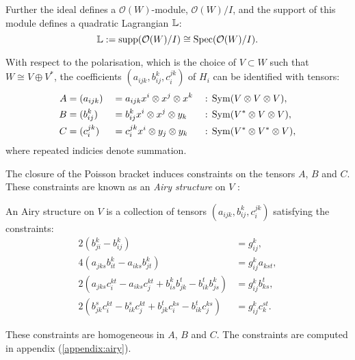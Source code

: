     Further the ideal defines a \( \mathcal{O}(W) \)-module, \( \mathcal{O}(W)/I\), and  the support of this module defines a quadratic Lagrangian \( \mathbb{L} \): \[ \mathbb{L}  := \mathrm{supp}( \mathcal{O}(W)/I ) \cong \mathrm{Spec}( \mathcal{O}(W)/I ) .\]
    
    With respect to the polarisation, which is the choice of \(V\subset W\) such that \(W\cong V\oplus V^*\), the coefficients \((a_{ijk},b_{ij}^k,c_{i}^{jk})\) of \(H_i\)  can be identified with tensors:
    \begin{alignat*}{3}  
    \label{airytensor}
    A & =(a_{ijk}) && = a_{ijk}x^i \otimes x^j \otimes x^k && : \,  \mathrm{Sym}(V\otimes V\otimes V),\\
    B & =(b_{ij}^k) && = b_{ij}^k x^i \otimes x^j \otimes y_k &&  :\,  \mathrm{Sym}( V^*\otimes V\otimes V),\\   
    C & =(c_i^{jk}) && = c_i^{jk}x^i \otimes y_j \otimes y_k &&  :\,  \mathrm{Sym}( V^*\otimes V^*\otimes V),
    \end{alignat*}
    where repeated indicies denote summation.
    
    The closure of the Poisson bracket induces constraints on the tensors \(A\), \(B\) and \(C\). These constraints are known as an \emph{Airy structure} on \(V\) \cite{ks_airy, abcd}:  

    \begin{defn}\label{defn:airystruct} An Airy structure on \(V\) is a collection of tensors \( (a_{ijk},b_{ij}^k,c_i^{jk})\) satisfying the constraints:
    \begin{align*}
       2 \left(  b_{ji}^k - b_{ij}^k \right) &= g_{ij}^k,\\
       4\left( a_{jks} b_{it}^k -  a_{iks} b_{jt}^k \right) &=  g_{ij}^k  a_{kst}, \\
       2\left(  a_{jks} c_i^{k t} -  a_{ik s} c_j^{k t} +  b_{is}^k b_{jk}^t  -  b_{ik}^t b_{js}^k \right) & =  g_{ij}^k b_{ ks}^t, \\ 
       2 \left( b_{jk}^s c_i^{kt}  - b_{ik}^s c_j^{kt}+b_{jk}^t c_i^{ks}  - b_{ik}^t c_j^{ks}\right) &= g_{ij}^k c_k^{st}.
    \end{align*}


    \end{defn}
    These constraints are homogeneous in \(A\), \(B\) and \(C\). The constraints are computed in appendix (\ref{appendix:airy}).


    
